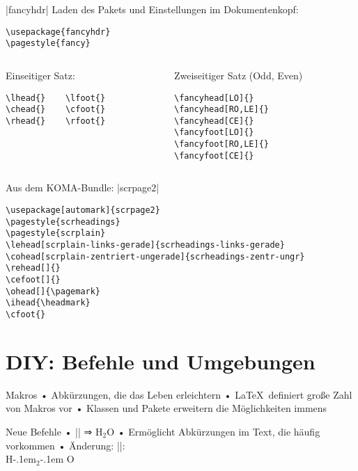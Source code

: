 \begin{frame}[fragile]{|fancyhdr|}
Laden des Pakets und Einstellungen im Dokumentenkopf:
\begin{lstlisting}
\usepackage{fancyhdr}
\pagestyle{fancy}
\end{lstlisting}
\begin{columns}
\begin{column}{.4\textwidth}
Einseitiger Satz:
\begin{lstlisting}
\lhead{}    \lfoot{}
\chead{}    \cfoot{}
\rhead{}    \rfoot{}
\end{lstlisting}
\end{column}
\pause
\begin{column}{.4\textwidth}
Zweiseitiger Satz (Odd, Even)
\begin{lstlisting}
\fancyhead[LO]{}
\fancyhead[RO,LE]{}
\fancyhead[CE]{}
\fancyfoot[LO]{}
\fancyfoot[RO,LE]{}
\fancyfoot[CE]{}
\end{lstlisting}
\end{column}
\end{columns}
\end{frame}

\begin{frame}[fragile]{Aus dem KOMA-Bundle: |scrpage2|}
\begin{lstlisting}
\usepackage[automark]{scrpage2}
\pagestyle{scrheadings}
\pagestyle{scrplain}
\lehead[scrplain-links-gerade]{scrheadings-links-gerade}
\cohead[scrplain-zentriert-ungerade]{scrheadings-zentr-ungr}
\rehead[]{}
\cefoot[]{}
\ohead[]{\pagemark}
\ihead{\headmark}
\cfoot{}
\end{lstlisting}
\end{frame}

\section{DIY: Befehle und Umgebungen}

\begin{frame}[fragile]{Makros}
• Abkürzungen, die das Leben erleichtern
• \LaTeX\ definiert große Zahl von Makros vor
• Klassen und Pakete erweitern die Möglichkeiten immens
\•
\end{frame}

\begin{frame}[fragile]{Neue Befehle}
• |\newcommand{\wasser}{H$_2$O}| ⇒ H$_2$O
• Ermöglicht Abkürzungen im Text, die häufig vorkommen\pause
• Änderung: |\renewcommand{\wasser}{H\kern-.1em$_2$\kern-.1em O}|:\\ H\kern-.1em$_2$\kern-.1em O
\• 
\end{frame}

